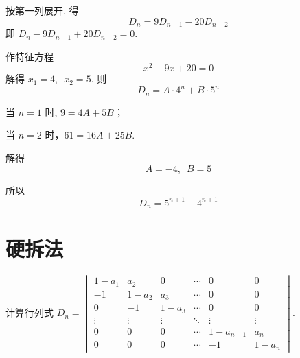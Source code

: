 \begin{solution}
    按第一列展开, 得
    \[ D_n=9 D_{n-1}-20 D_{n-2} \]
    即 $ D_n-9 D_{n-1}+20 D_{n-2}=0 $.

    作特征方程
    \[ x^{2}-9 x+20=0 \]
    解得 $ x_1=4,\enspace x_2=5 $. 则
    \[ D_n=A \cdot 4^n+B \cdot 5^n \]

    当 $n=1$ 时, $9=4A+5B$；

    当 $n=2$ 时，$61=16A+25B$.

    解得
    \[ A=-4,\enspace B=5 \]

    所以
    \[ D_n=5^{n+1}-4^{n+1} \]
\end{solution}

\section{硬拆法}

\begin{example}
    计算行列式
    $D_n=\begin{vmatrix}
        1-a_{1} & a_{2} & 0 & \cdots & 0 & 0 \\
        -1 & 1-a_{2} & a_{3} & \cdots & 0 & 0 \\
        0 & -1 & 1-a_{3} & \cdots & 0 & 0 \\
        \vdots & \vdots & \vdots & \ddots & \vdots & \vdots \\
        0 & 0 & 0 & \cdots & 1-a_{n-1} & a_n \\
        0 & 0 & 0 & \cdots & -1 & 1-a_n
    \end{vmatrix}$.
\end{example}

